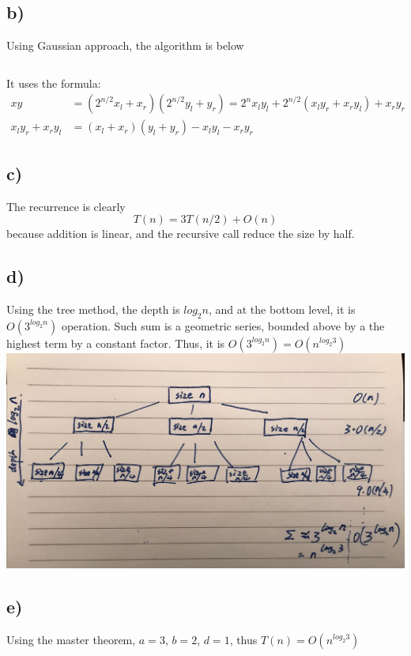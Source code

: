 \documentclass{article}
\begin{document}
\subsection*{b)}
Using Gaussian approach, the algorithm is below
\inputminted{Python}{algo.py}
It uses the formula:
\begin{align*}
    xy &= (2^{n/2}  x_l + x_r)(2^{n/2} y_l + y_r) = 2^n x_l y_l + 2^{n/2}(x_l y_r + x_r y_l) + x_r y_r \\
    x_l y_r + x_r y_l &= (x_l + x_r)(y_l + y_r) - x_l y_l -x_r y_r
\end{align*}

\subsection*{c)}
The recurrence is clearly
$$ T(n) = 3T(n / 2) + O(n) $$
because addition is linear, and the recursive call reduce the size by half.
\subsection*{d)}
Using the tree method, the depth is $log_2 n$, and at the bottom
level, it is $O(3^{log_2 n})$ operation. Such sum is a geometric series, bounded above by a the highest term
by a constant factor. Thus, it is $O(3^{log_2 n}) = O(n^{log_2 3})$ \\
\includegraphics[width=\textwidth,height=\textheight,keepaspectratio]{tree.jpg}
\subsection*{e)}
Using the master theorem, 
$a = 3$, $b = 2$, $d = 1$, thus $T(n) = O(n^{log_2 3})$
\end{document}
